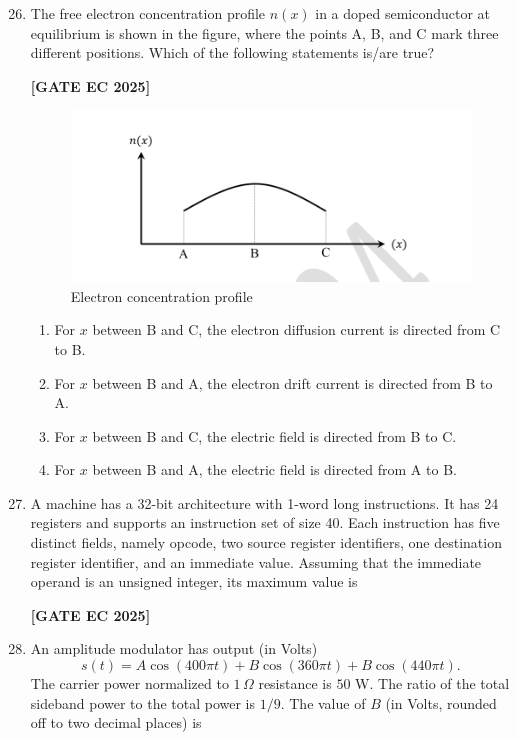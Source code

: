 \documentclass[12pt]{article}
\begin{document}
\begin{enumerate}[leftmargin=1.5em, label=\textbf{Q.\arabic*}., itemsep=2em]
\setcounter{enumi}{25}

\item The free electron concentration profile $n(x)$ in a doped semiconductor at equilibrium is shown in the figure, where the points A, B, and C mark three different positions. Which of the following statements is/are true?

\noindent \textbf{[GATE EC 2025]}
\begin{figure}[H]\centering
\includegraphics[width=0.65\columnwidth]{figs/q26.png}
\caption{Electron concentration profile}
\label{fig:q26}
\end{figure}
\begin{multicols}{2}
\begin{enumerate}
    \item For $x$ between B and C, the electron diffusion current is directed from C to B.
    \item For $x$ between B and A, the electron drift current is directed from B to A.
    \item For $x$ between B and C, the electric field is directed from B to C.
    \item For $x$ between B and A, the electric field is directed from A to B.
\end{enumerate}
\end{multicols}

\item A machine has a 32-bit architecture with 1-word long instructions. It has 24 registers and supports an instruction set of size 40. Each instruction has five distinct fields, namely opcode, two source register identifiers, one destination register identifier, and an immediate value. Assuming that the immediate operand is an unsigned integer, its maximum value is

\noindent \textbf{[GATE EC 2025]}

\item An amplitude modulator has output (in Volts)
\[
s(t) = A \cos(400\pi t) + B \cos(360\pi t) + B \cos(440\pi t).
\]
The carrier power normalized to $1 \,\Omega$ resistance is $50$ W. The ratio of the total sideband power to the total power is $1/9$. The value of $B$ (in Volts, rounded off to two decimal places) is


\end{enumerate}
\end{document}
